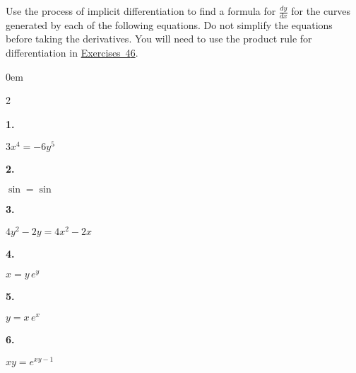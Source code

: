 \documentclass[12pt,]{book}
\theoremstyle{plain}
\theoremstyle{definition}
\numberwithin{equation}{section}
\newenvironment{exercisegroup}%
{\medskip\noindent}%
{\par\bigskip}%
\newlength{\exercisegroupindent}%
\newlength{\exercisegroupitemwidth}%
\newenvironment{exercisegrouplist}%
{\vspace{-\partopsep}%
\begin{adjustwidth}{\exercisegroupindent}{0em}}%
{\end{adjustwidth}%
\vspace{-\partopsep}%
\vspace{\baselineskip}}%
\newenvironment{exercisegroupbycol}[1]%
{\begin{exercisegrouplist}%
\vspace{-\multicolsep}%
\begin{multicols}{#1}%
\setlength{\parindent}{0em}%
\setlength{\exercisegroupitemwidth}{\linewidth}}%
{\end{multicols}%
\vspace{-\multicolsep}%
\end{exercisegrouplist}}%
\newenvironment{exercisegroupitem}[1]%
{\begin{minipage}[t]{\exercisegroupitemwidth}
\vspace{0pt}%
{\bfseries#1}%
\rule{0pt}{\baselineskip}}{\strut%
\end{minipage}%
\hspace{\columnsep}}%
\providecommand\phantomsection{}
\newcommand{\fe}[2]{\mathop{{#1}{\left(#2\right)}}}
\newcommand{\lz}[2]{\frac{d#1}{d#2}}
\begin{document}
\begin{exercisegroup}%
Use the process of implicit differentiation to find a formula for \(\lz{y}{x}\) for the curves generated by each of the following equations. Do not simplify the equations before taking the derivatives. You will need to use the product rule for differentiation in \hyperref[exercise-implicit-middle]{Exercises~4}\textendash{}\hyperref[exercise-implicit-last]{6}.%
\par
\begin{exercisegroupbycol}{2}%
\begin{exercisegroupitem}{1. }\phantomsection\hypertarget{exercise-378}{\null}
\(3x^4=-6y^5\)%
\end{exercisegroupitem}%
\par%
\begin{exercisegroupitem}{2. }\phantomsection\hypertarget{exercise-379}{\null}
\(\fe{\sin}{x}=\fe{\sin}{y}\)%
\end{exercisegroupitem}%
\par%
\begin{exercisegroupitem}{3. }\phantomsection\hypertarget{exercise-380}{\null}
\(4y^2-2y=4x^2-2x\)%
\end{exercisegroupitem}%
\par%
\begin{exercisegroupitem}{4. }\phantomsection\hypertarget{exercise-implicit-middle}{\null}
\(x=y\,e^y\)%
\end{exercisegroupitem}%
\par%
\begin{exercisegroupitem}{5. }\phantomsection\hypertarget{exercise-implicit-lambert}{\null}
\(y=x\,e^x\)%
\end{exercisegroupitem}%
\par%
\begin{exercisegroupitem}{6. }\phantomsection\hypertarget{exercise-implicit-last}{\null}
\(xy=e^{xy-1}\)%
\end{exercisegroupitem}%
\par%
\end{exercisegroupbycol}%
\end{exercisegroup}%
\end{document}
